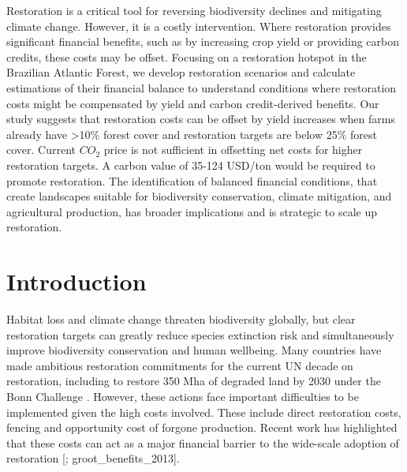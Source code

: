 \documentclass[
	12pt,				%
	oneside,			%
	a4paper,			%
	chapter=TITLE,		%
	section=TITLE,		%
	brazil,			%
	english				%
	]{abntex2}
\begin{document}
Restoration is a critical tool for reversing biodiversity declines and mitigating climate change. However, it is a costly intervention. Where restoration provides significant financial benefits, such as by increasing crop yield or providing carbon credits, these costs may be offset. Focusing on a restoration hotspot in the Brazilian Atlantic Forest, we develop restoration scenarios and calculate estimations of their financial balance to understand conditions where restoration costs might be compensated by yield and carbon credit-derived benefits. Our study suggests that restoration costs can be offset by yield increases when farms already have \textgreater10\% forest cover and restoration targets are below 25\% forest cover. Current \(CO_2\) price is not sufficient in offsetting net costs for higher restoration targets. A carbon value of 35-124 USD/ton would be required to promote restoration. The identification of balanced financial conditions, that create landscapes suitable for biodiversity conservation, climate mitigation, and agricultural production, has broader implications and is strategic to scale up restoration.

\hypertarget{introduction-1}{%
\section{Introduction}\label{introduction-1}}

Habitat loss \autocite{tilman_future_2017} and climate change \autocite{foden_identifying_2013} threaten biodiversity globally, but clear restoration targets can greatly reduce species extinction risk \autocite{leclere_bending_2020,strassburg_global_2020} and simultaneously improve biodiversity conservation and human wellbeing\autocite{barral_quantifying_2015,benayas_enhancement_2009,bullock_long-term_2007,rey_benayas_restoration_2012,shimamoto_how_2014,wade_ecological_2008}. Many countries have made ambitious restoration commitments for the current UN decade on restoration, including to restore 350 Mha of degraded land by 2030 under the Bonn Challenge \autocite{erbaugh_global_2020}. However, these actions face important difficulties to be implemented given the high costs involved. These include direct restoration costs, fencing and opportunity cost of forgone production. Recent work has highlighted that these costs can act as a major financial barrier to the wide-scale adoption of restoration {[}\textcite{brancalion_what_2019}; groot\_benefits\_2013{]}.
\end{document}
